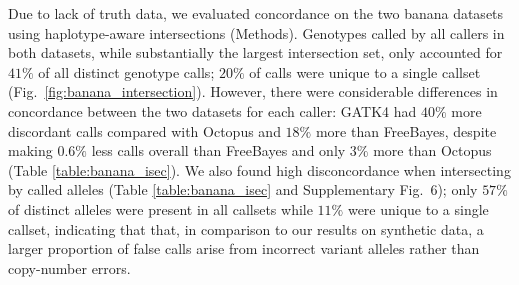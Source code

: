 \documentclass[notitlepage, twocolumn, 10pt]{article}
\begin{document}
Due to lack of truth data, we evaluated concordance on the two banana datasets using haplotype-aware intersections (Methods). Genotypes called by all callers in both datasets, while substantially the largest intersection set, only accounted for $41\%$ of all distinct genotype calls; $20\%$ of calls were unique to a single callset (Fig.\ \ref{fig:banana_intersection}). However, there were considerable differences in concordance between the two datasets for each caller: GATK4 had $40\%$ more discordant calls compared with Octopus and $18\%$ more than FreeBayes, despite making $0.6\%$ less calls overall than FreeBayes and only $3\%$ more than Octopus (Table \ref{table:banana_isec}). We also found high disconcordance when intersecting by called alleles (Table \ref{table:banana_isec} and Supplementary Fig.\ 6); only $57\%$ of distinct alleles were present in all callsets while $11\%$ were unique to a single callset, indicating that that, in comparison to our results on synthetic data, a larger proportion of false calls arise from incorrect variant alleles rather than copy-number errors.

\begin{table}[bp]
%
\end{table}
\end{document}
